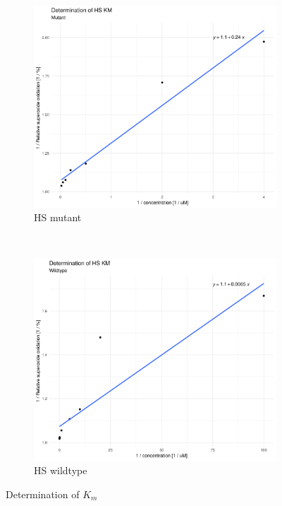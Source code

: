 \begin{figure}
    \centering
    \begin{subfigure}{0.45\textwidth}
	\includegraphics[width=\textwidth]{img/activity_mut_km_lb.png}
	\caption{HS mutant}
	\label{fig:activity_mut_km_lb}
    \end{subfigure}
    ~
    \begin{subfigure}{0.45\textwidth}
	\includegraphics[width=\textwidth]{img/activity_wt_km_lb.png}
	\caption{HS wildtype}
	\label{fig:activity_wt_km_lb}
    \end{subfigure}
    \caption{Determination of $K_m$}
    \label{fig:activity_km_lb}
\end{figure}

